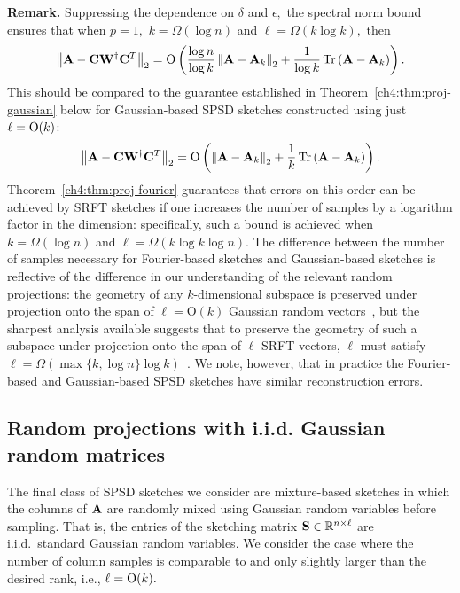 \noindent
\textbf{Remark.}
Suppressing the dependence on $\delta$ and $\epsilon,$ the spectral norm 
bound ensures that when $p=1,$ $k = \Omega(\log n)$ and $\ell = \Omega(k \log k),$ then
\[
\left\|\mathbf{A} - \mathbf{C} \mathbf{W}^\dagger \mathbf{C}^T\right\|_2 = 
\mbox{O}\left( \frac{\log n }{\log k} \left\|\mathbf{A} - \mathbf{A}_k\right\|_2 + 
\frac{1}{\log k} \operatorname{Tr}\left(\mathbf{A} - \mathbf{A}_k\right)\right). 
\]
This should be compared to the guarantee established in Theorem~\ref{ch4:thm:proj-gaussian} 
below for Gaussian-based SPSD sketches constructed using just $\ell = \mathrm{O}(k)$:
\[
\left\|\mathbf{A} - \mathbf{C} \mathbf{W}^\dagger \mathbf{C}^T\right\|_2 = 
\mbox{O}\left( \left\|\mathbf{A} - \mathbf{A}_k\right\|_2 + 
\frac{1}{k} \operatorname{Tr}\left(\mathbf{A} - \mathbf{A}_k\right)\right). 
\]
Theorem~\ref{ch4:thm:proj-fourier} guarantees that errors on this order can be achieved by
SRFT sketches if one
increases the number of samples by a logarithm factor in the dimension: specifically, such
a bound is achieved when $k = \Omega(\log n)$ and $\ell = \Omega(k \log k \log n).$
The difference between the number of samples necessary for Fourier-based sketches and
Gaussian-based sketches is reflective of the difference in our understanding of the relevant 
random projections: the geometry of any $k$-dimensional 
subspace is preserved under projection onto the span of $\ell = \mbox{O}(k)$ Gaussian
random vectors~\cite{HMT11}, but the sharpest analysis available suggests that to preserve
the geometry of such a subspace under projection onto the span of $\ell$
SRFT vectors, $\ell$ must satisfy $\ell = \Omega(\max\{k, \log n\} \log k)$~\cite{Tro11}. 
We note, however, that in
practice the Fourier-based and Gaussian-based SPSD sketches have similar 
reconstruction errors.


\subsection{Random projections with i.i.d. Gaussian random matrices}
\label{ch4:sec:theory-rand-gaussian}

The final class of SPSD sketches we consider are mixture-based sketches in which
the columns of $\mathbf{A}$ are randomly mixed using Gaussian random variables before 
sampling. That is, the entries of the sketching matrix $\mathbf{S} \in \mathbb{R}^{n \times \ell}$ are 
i.i.d.~standard Gaussian random variables. 
We consider the case where the number of column samples is comparable 
to and only slightly larger than the desired rank, i.e., $\ell=\mathrm{O}(k).$ 

